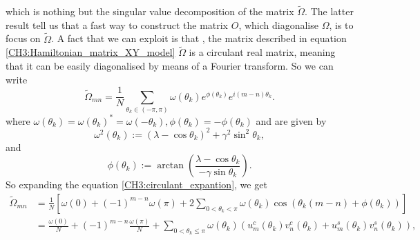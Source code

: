which is nothing but the singular value decomposition of the matrix $\tilde{\Omega}$. The latter result tell us that a fast way to construct the matrix $O$, which diagonalise $\Omega$, is to focus on $\tilde{\Omega}$.
\newline
A fact that we can exploit is that , the matrix described in equation \eqref{CH3:Hamiltonian_matrix_XY_model} $\tilde{\Omega}$ is a circulant real matrix, meaning that it can be easily diagonalised by means of a Fourier transform. So we can write
\begin{equation}
\tilde{\Omega}_{m n}=\frac{1}{N} \sum_{\theta_{k} \in(-\pi, \pi)} \omega\left(\theta_{k}\right) e^{\phi\left(\theta_{k}\right)} e^{i(m-n) \theta_{k}}.
\label{CH3:circulant_expantion}
\end{equation}
where $\omega\left(\theta_{k}\right)=\omega\left(\theta_{k}\right)^{*}=\omega\left(-\theta_{k}\right), \phi\left(\theta_{k}\right)=-\phi\left(\theta_{k}\right)$ and are given by
\begin{equation}
\omega^{2}\left(\theta_{k}\right):=\left(\lambda-\cos \theta_{k}\right)^{2}+\gamma^{2} \sin ^{2} \theta_{k},
\end{equation}
and
\begin{equation}
\phi\left(\theta_{k}\right):=\arctan \left(\frac{\lambda-\cos \theta_{k}}{-\gamma \sin \theta_{k}}\right).
\end{equation}
So expanding the equation \eqref{CH3:circulant_expantion}, we get
\begin{equation}
\begin{aligned}
\tilde{\Omega}_{m n} &=\frac{1}{N}\left[\omega(0)+(-1)^{m-n} \omega(\pi)+2 \sum_{0<\theta_{k}<\pi} \omega\left(\theta_{k}\right) \cos \left(\theta_{k}(m-n)+\phi\left(\theta_{k}\right)\right)\right] \\
&=\frac{\omega(0)}{N}+(-1)^{m-n} \frac{\omega(\pi)}{N}+\sum_{0<\theta_{k} \leq \pi} \omega\left(\theta_{k}\right)\left(u_{m}^{c}\left(\theta_{k}\right) v_{n}^{c}\left(\theta_{k}\right)+u_{m}^{s}\left(\theta_{k}\right) v_{n}^{s}\left(\theta_{k}\right)\right),
\end{aligned}
\end{equation}

